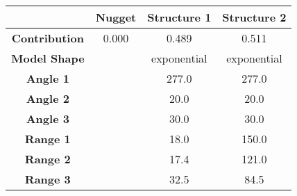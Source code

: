 \begin{tabular}{cccc}
\toprule
{} & Nugget &  Structure 1 &  Structure 2 \\
\midrule
\textbf{Contribution} &  0.000 &        0.489 &        0.511 \\
\textbf{Model Shape } &        &  exponential &  exponential \\
\textbf{Angle 1     } &        &        277.0 &        277.0 \\
\textbf{Angle 2     } &        &         20.0 &         20.0 \\
\textbf{Angle 3     } &        &         30.0 &         30.0 \\
\textbf{Range 1     } &        &         18.0 &        150.0 \\
\textbf{Range 2     } &        &         17.4 &        121.0 \\
\textbf{Range 3     } &        &         32.5 &         84.5 \\
\bottomrule
\end{tabular}
